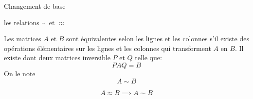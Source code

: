 \begin{parag}{Changement de base}
\begin{truc}
    \end{truc}
    \begin{subparag}{les relations $\sim$ et $\approx$}
    \begin{definition}
        Les matrices $A$ et $B$ sont équivalentes selon les lignes et les colonnes s'il existe des opérations élémentaires sur les lignes et les colonnes qui transforment $A$ en $B$. Il existe dont deux matrices inversible $P$ et $Q$ telle que:
        \[PAQ = B\]
        On le note
        \[A \sim B\]
    \end{definition}
    \begin{truc}
    \[A \approx B \implies A \sim B\]
    \end{truc}
        
    \end{subparag}
\end{parag}
